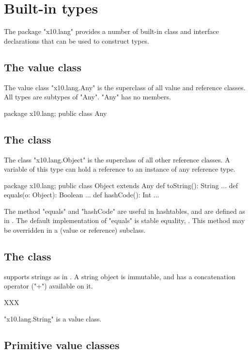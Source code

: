 \section{Built-in types}

The package \xcd"x10.lang" provides a number of built-in class and
interface declarations that can be used to construct types.

\subsection{The value class }\label{Any}

The value class \xcd"x10.lang.Any" is the superclass of all
value and reference classes.  All \Xten{} types are subtypes of
\xcd"Any".  \xcd"Any" has no members.

\begin{xten}
package x10.lang;
public class Any { }
\end{xten}

\subsection{The class }\label{Object}
The class \xcd"x10.lang.Object" is the superclass of all other reference
classes.
A variable of this type can hold a reference to an instance of any
reference type.

\begin{xten}
package x10.lang;
public class Object extends Any {
  def toString(): String {...}
  def equals(o: Object): Boolean {...}
  def hashCode(): Int {...}
}
\end{xten}

The method \xcd"equals" and \xcd"hashCode" are useful in hashtables,
and are defined as in \java. The default implementation of \xcd"equals"
is stable equality, . This method may be overridden
in a (value or reference) subclass.

\subsection{The class }
\Xten{} supports strings as in \java{}. A string object is immutable,
and has a concatenation operator (\xcd"+")  available on it.

XXX

\xcd"x10.lang.String" is a value class.


\subsection{Primitive value classes}

